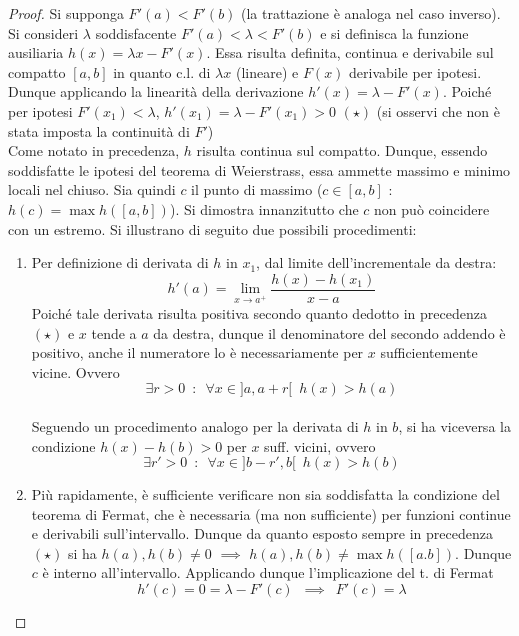 \documentclass[10pt, oneside]{book}
\theoremstyle{plain}
\begin{document}
\begin{proof}
    Si supponga $F'(a) < F'(b)$ (la trattazione è analoga nel caso inverso). Si consideri $\lambda$ soddisfacente $F'(a) < \lambda < F'(b)$ e si definisca la funzione ausiliaria $h(x) = \lambda x - F'(x)$. Essa risulta definita, continua e derivabile sul compatto $[a,b]$ in quanto c.l. di $\lambda x$ (lineare) e $F(x)$ derivabile per ipotesi. Dunque applicando la linearità della derivazione $h'(x) = \lambda - F'(x)$. Poiché per ipotesi $F'(x_1) < \lambda$, $h'(x_1) = \lambda - F'(x_1) > 0$ $(\star)$ (si osservi che non è stata imposta la continuità di $F'$)
    \\Come notato in precedenza, $h$ risulta continua sul compatto. Dunque, essendo soddisfatte le ipotesi del teorema di Weierstrass, essa ammette massimo e minimo locali nel chiuso. Sia quindi $c$ il punto di massimo ($c \in [a,b]$ : $h(c) = \max h([a,b])$). Si dimostra innanzitutto che $c$ non può coincidere con un estremo. Si illustrano di seguito due possibili procedimenti:
    \begin{enumerate}
        \item Per definizione di derivata di $h$ in $x_1$, dal limite dell'incrementale da destra:
        \[h'(a) = \lim \limits_{x \rightarrow a^+} \frac{h(x) - h(x_1)}{x - a}\]
        Poiché tale derivata risulta positiva secondo quanto dedotto in precedenza $(\star)$ e $x$ tende a $a$ da destra, dunque il denominatore del secondo addendo è positivo, anche il numeratore lo è necessariamente per $x$ sufficientemente vicine. Ovvero 
        \[\exists r > 0 \enspace  : \enspace \forall x \in ]a, a + r[ \enspace  h(x) > h(a)\]
        \\Seguendo un procedimento analogo per la derivata di $h$ in $b$, si ha viceversa la condizione $h(x) - h(b) > 0$ per $x$ suff. vicini, ovvero
        \[\exists r'>0 \enspace : \enspace \forall x \in ]b - r', b[ \enspace h(x) > h(b)\]
        \item Più rapidamente, è sufficiente verificare non sia soddisfatta la condizione del teorema di Fermat, che è necessaria (ma non sufficiente) per funzioni continue e derivabili sull'intervallo. Dunque da quanto esposto sempre in precedenza $(\star)$ si ha $h(a), h(b) \neq 0$ $\implies$ $h(a) , h(b) \neq \max h([a.b])$. Dunque $c$ è interno all'intervallo. Applicando dunque l'implicazione del t. di Fermat 
        \[h'(c) = 0 = \lambda - F'(c) \enspace \implies \enspace F'(c) = \lambda\]
    \end{enumerate}
\end{proof}
\end{document}
